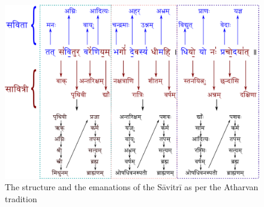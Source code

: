 \documentclass[12pt]{article}
\begin{document}
 \begin{figure}[h]
  \centering
    \includegraphics[width=\textwidth]{savitri_fig1}
    \caption{The structure and the emanations of the Sāvitrī as per the Atharvan tradition}
    \label{fig:fig1}
    \end{figure}
\end{document}

